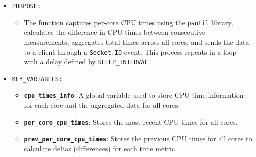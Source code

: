 \documentclass[12pt]{article}
\begin{document}
 \begin{itemize}
        \item \texttt{PURPOSE:}
        \begin{itemize}
            \item The function captures per-core CPU times using the \texttt{psutil} library, calculates the difference in CPU times between consecutive measurements, aggregates total times across all cores, and sends the data to a client through a \texttt{Socket.IO} event. This process repeats in a loop with a delay defined by \texttt{SLEEP\_INTERVAL}.
        \end{itemize}

        \item \texttt{KEY\_VARIABLES:}
        \begin{itemize}
            \item \textbf{\texttt{cpu\_times\_info}}: A global variable used to store CPU time information for each core and the aggregated data for all cores.
            \item \textbf{\texttt{per\_core\_cpu\_times}}: Stores the most recent CPU times for all cores.
            \item \textbf{\texttt{prev\_per\_core\_cpu\_times}}: Stores the previous CPU times for all cores to calculate deltas (differences) for each time metric.
        \end{itemize}


\end{itemize}
\end{document}
